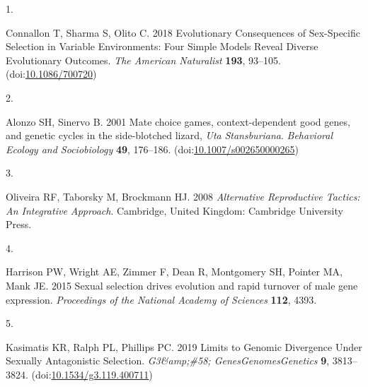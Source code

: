 \documentclass[
  11pt,
]{article}
\newlength{\cslhangindent}
\newlength{\csllabelwidth}
\newlength{\cslentryspacingunit} %
\newenvironment{CSLReferences}[2] %
 {%
  \setlength{\parindent}{0pt}
  \ifodd #1
  \let\oldpar\par
  \def\par{\hangindent=\cslhangindent\oldpar}
  \fi
  \setlength{\parskip}{#2\cslentryspacingunit}
 }%
 {}
\newcommand{\CSLLeftMargin}[1]{\parbox[t]{\csllabelwidth}{#1}}
\newcommand{\CSLRightInline}[1]{\parbox[t]{\linewidth - \csllabelwidth}{#1}\break}
\begin{document}
\hypertarget{refs}{}
\begin{CSLReferences}{0}{0}
\leavevmode{}%
\CSLLeftMargin{1. }
\CSLRightInline{Connallon T, Sharma S, Olito C. 2018 Evolutionary {Consequences} of {Sex-Specific Selection} in {Variable Environments}: {Four Simple Models Reveal Diverse Evolutionary Outcomes}. \emph{The American Naturalist} \textbf{193}, 93--105. (doi:\href{https://doi.org/10.1086/700720}{10.1086/700720})}

\leavevmode{}%
\CSLLeftMargin{2. }
\CSLRightInline{Alonzo SH, Sinervo B. 2001 Mate choice games, context-dependent good genes, and genetic cycles in the side-blotched lizard, {\emph{Uta}}{ \emph{Stansburiana}}. \emph{Behavioral Ecology and Sociobiology} \textbf{49}, 176--186. (doi:\href{https://doi.org/10.1007/s002650000265}{10.1007/s002650000265})}

\leavevmode{}%
\CSLLeftMargin{3. }
\CSLRightInline{Oliveira RF, Taborsky M, Brockmann HJ. 2008 \emph{Alternative {Reproductive Tactics}: {An Integrative Approach}}. {Cambridge, United Kingdom}: {Cambridge University Press}. }

\leavevmode{}%
\CSLLeftMargin{4. }
\CSLRightInline{Harrison PW, Wright AE, Zimmer F, Dean R, Montgomery SH, Pointer MA, Mank JE. 2015 Sexual selection drives evolution and rapid turnover of male gene expression. \emph{Proceedings of the National Academy of Sciences} \textbf{112}, 4393.}

\leavevmode{}%
\CSLLeftMargin{5. }
\CSLRightInline{Kasimatis KR, Ralph PL, Phillips PC. 2019 Limits to {Genomic Divergence Under Sexually Antagonistic Selection}. \emph{G3\&amp;\#58; Genes\textbar Genomes\textbar Genetics} \textbf{9}, 3813--3824. (doi:\href{https://doi.org/10.1534/g3.119.400711}{10.1534/g3.119.400711})}

\end{CSLReferences}
\end{document}
